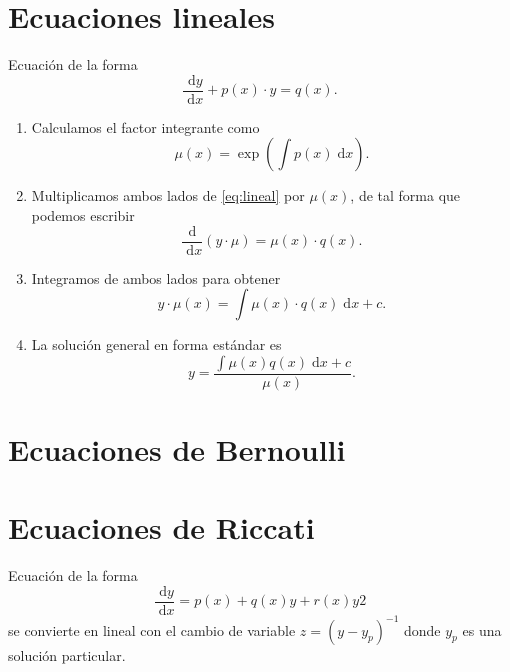 \documentclass[a4paper]{article}
\newcommand{\dif}[1]{\;\mathrm{d}#1}
\begin{document}
\section{Ecuaciones lineales}
Ecuación de la forma 
\begin{equation}
    \label{eq:lineal}
    \frac{\dif{y}}{\dif{x}} + p(x) \cdot y = q(x).
\end{equation}

\begin{enumerate}
    \item Calculamos el factor integrante como 
    \begin{equation*}
        \mu(x) = \exp \left( \int p(x) \dif{x} \right).
    \end{equation*}

    \item Multiplicamos ambos lados de \eqref{eq:lineal} por $\mu(x)$, de tal forma que podemos escribir
    \begin{equation*}
        \frac{\mathrm{d}}{\dif{x}} \left( y \cdot \mu \right) = \mu(x) \cdot q(x).
    \end{equation*}

    \item Integramos de ambos lados para obtener
    \begin{equation*}
        y \cdot \mu(x) = \int \mu(x) \cdot q(x) \dif{x} + c.
    \end{equation*}

    \item La solución general en forma estándar es
    \begin{equation*}
        y = \frac{\int \mu(x) q(x) \dif{x} + c }{\mu(x)}.
    \end{equation*}
\end{enumerate}

\section{Ecuaciones de Bernoulli}

\section{Ecuaciones de Riccati}
Ecuación de la forma 
\begin{equation}
    \label{eq:riccati}
    \frac{\dif{y}}{\dif{x}} = p(x) + q(x)y + r(x)y 2
\end{equation}
se convierte en lineal con el cambio de variable $z = (y - y_p)^{-1}$ donde $y_{p}$ es una solución particular.
\end{document}

